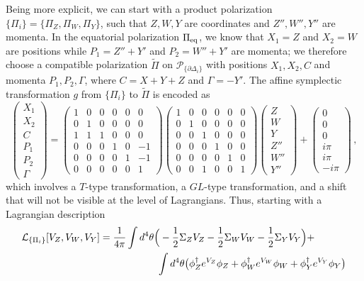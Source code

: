 \documentclass[hyper,letterpaper]{JHEP3}
\numberwithin{equation}{section}
\newcommand{\be}{\begin{equation}}
\newcommand{\ee}{\end{equation}}
\newcommand{\Z}{{\mathbb Z}}
\newcommand{\C}{{\mathbb C}}
\newcommand{\pd}{\partial}
\newcommand{\CL}{\mathcal{L}}
\newcommand{\CP}{\mathcal{P}}
\begin{document}
Being more explicit, we can start with a product polarization $\{\Pi_i\} = \{\Pi_Z,\Pi_W,\Pi_Y\}$, such that $Z,W,Y$ are coordinates and $Z'',W'',Y''$ are momenta. In the equatorial polarization $\Pi_{\rm eq}$, we know that $X_1 = Z$ and $X_2=W$ are positions while $P_1=Z''+Y'$ and $P_2=W''+Y'$ are momenta; we therefore choose a compatible polarization $\tilde\Pi$ on $\CP_{\{\pd\Delta_i\}}$ with positions $X_1,X_2,C$ and momenta $P_1,P_2,\Gamma$, where $C=X+Y+Z$ and $\Gamma=-Y'$. The affine symplectic transformation $g$ from $\{\Pi_i\}$ to $\tilde\Pi$ is encoded as
%
\be \begin{pmatrix} X_1\\X_2\\C\\P_1\\P_2\\\Gamma\end{pmatrix}= \begin{pmatrix} 1&0&0&0&0&0\\ 0&1&0&0&0&0\\1&1&1&0&0&0 \\0&0&0&1&0&-1\\0&0&0&0&1&-1\\0&0&0&0&0&1\end{pmatrix}\begin{pmatrix} 1&0&0&0&0&0\\0&1&0&0&0&0\\0&0&1&0&0&0\\0&0&0&1&0&0 \\0&0&0&0&1&0\\0&0&1&0&0&1\end{pmatrix} \begin{pmatrix} Z\\W\\Y\\Z''\\W''\\Y''\end{pmatrix}+\begin{pmatrix} 0\\0\\0\\i\pi\\i\pi\\-i\pi\end{pmatrix}\,, \label{Spbip3} \ee
%
which involves a $T$-type transformation, a $GL$-type transformation, and a shift that will not be visible at the level of Lagrangians. Thus, starting with a Lagrangian description
%
\begin{align} \CL_{\{\Pi_i\}}[V_Z,V_W,V_Y] &= \frac{1}{4\pi}\int d^4\theta\Big(-\frac12 \Sigma_ZV_Z-\frac12 \Sigma_WV_W-\frac12\Sigma_YV_Y\Big)+ \notag\\ &\hspace{.8in} \int d^4\theta \big( \phi_Z^\dagger e^{V_Z}\phi_Z+\phi_W^\dagger e^{V_W}\phi_W+\phi_Y^\dagger e^{V_Y}\phi_Y\big) \end{align}
\end{document}

